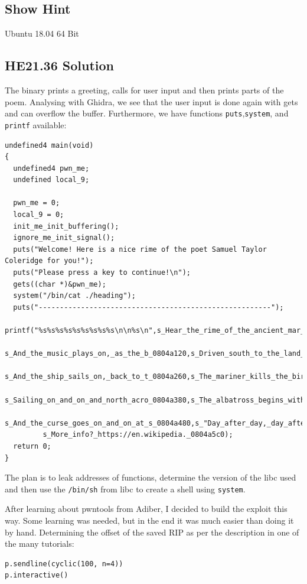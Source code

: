 \documentclass[english,a4paper,nols,noindent]{tufte-handout}
\begin{document}
\subsection{Show Hint}
Ubuntu 18.04 64 Bit

\hypertarget{he21.36-solution}{%
\subsection{HE21.36 Solution}\label{he21.36-solution}}

\noindent The binary prints a greeting, calls for user input and then prints
parts of the poem.  Analysing with Ghidra, we see that the user input is done
again with gets and can overflow the buffer.  Furthermore, we have functions
\verb+puts+,\verb+system+, and \verb+printf+ available:

\begin{verbatim}
undefined4 main(void)
{
  undefined4 pwn_me;
  undefined local_9;
  
  pwn_me = 0;
  local_9 = 0;
  init_me_init_buffering();
  ignore_me_init_signal();
  puts("Welcome! Here is a nice rime of the poet Samuel Taylor Coleridge for you!");
  puts("Please press a key to continue!\n");
  gets((char *)&pwn_me);
  system("/bin/cat ./heading");
  puts("-------------------------------------------------------");
  printf("%s%s%s%s%s%s%s%s%s\n\n%s\n",s_Hear_the_rime_of_the_ancient_mar_0804a060,
         s_And_the_music_plays_on,_as_the_b_0804a120,s_Driven_south_to_the_land_of_the_s_0804a1a0,
         s_And_the_ship_sails_on,_back_to_t_0804a260,s_The_mariner_kills_the_bird_of_go_0804a2c0,
         s_Sailing_on_and_on_and_north_acro_0804a380,s_The_albatross_begins_with_its_ve_0804a3e0,
         s_And_the_curse_goes_on_and_on_at_s_0804a480,s_"Day_after_day,_day_after_day_We_0804a4e0,
         s_More_info?_https://en.wikipedia._0804a5c0);
  return 0;
}
\end{verbatim}

\noindent The plan is to leak addresses of functions, determine the version of the libc
used and then use the \verb+/bin/sh+ from libc to create a shell using
\verb+system+.

After learning about pwntools from Adiber, I decided to build the exploit this
way.  Some learning was needed, but in the end it was much easier than doing it
by hand.  Determining the offset of the saved RIP as per the description in one
of the many tutorials:

\begin{verbatim}
p.sendline(cyclic(100, n=4))
p.interactive()
\end{verbatim}
\end{document}
